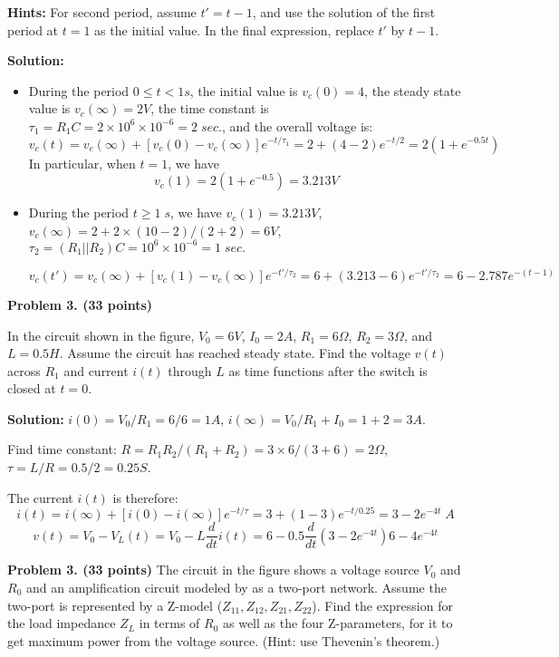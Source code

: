 \begin{enumerate}
{\bf Hints:} For second period, assume $t'=t-1$, and use the solution of
the first period at $t=1$ as the initial value. In the final expression, 
replace $t'$ by $t-1$.


   {\bf Solution:}
   \begin{itemize}
   \item During the period $0\le t<1 s$, the initial value is 
  	$v_c(0)=4$, the steady state value is $v_c(\infty)=2V$, the time 
  	constant is $\tau_1=R_1C=2\times 10^6\times 10^{-6}=2\;sec.$, and 
  	the overall voltage is:
  \[ v_c(t)=v_c(\infty)+[v_c(0)-v_c(\infty)] e^{-t/\tau_1}
  	=2+(4-2) e^{-t/2}=2(1+e^{-0.5t})	\]
   In particular, when $t=1$, we have
   \[ v_c(1)=2(1+e^{-0.5})=3.213V	\]
   
   \item During the period $t \ge 1\;s$, we have $v_c(1)=3.213V$, 
   	$v_c(\infty)=2+2\times (10-2)/(2+2)=6V$,
   	$\tau_2=(R_1||R_2)C=10^6 \times 10^{-6}=1\; sec.$
  
   \[	v_c(t')=v_c(\infty)+[v_c(1)-v_c(\infty)]e^{-t'/\tau_2}
   	=6+(3.213-6)e^{-t'/\tau_2}=6-2.787e^{-(t-1)} \]
  
 \end{itemize}

\end{enumerate}



\item {\bf Problem 3. (33 points)} 

In the circuit shown in the figure, $V_0=6V$, $I_0=2A$, $R_1=6\Omega$, 
$R_2=3\Omega$, and $L=0.5H$. Assume the circuit has reached steady state.
Find the voltage $v(t)$ across $R_1$ and current $i(t)$ through $L$ as 
time functions after the switch is closed at $t=0$.


{\bf Solution:} 
$i(0)=V_0/R_1=6/6=1A$, $i(\infty)=V_0/R_1+I_0=1+2=3A$. 

Find time constant: $R=R_1R_2/(R_1+R_2)=3\times 6/(3+6)=2\Omega$,
$\tau=L/R=0.5/2=0.25S$. 

The current $i(t)$ is therefore:
\[ i(t)=i(\infty)+[i(0)-i(\infty)]e^{-t/\tau}=3+(1-3)e^{-t/0.25}
	=3-2e^{-4t} \;A \]
\[ v(t)=V_0-V_L(t)=V_0-L\frac{d}{dt}i(t)=6-0.5 \frac{d}{dt}(3-2e^{-4t})
	6-4e^{-4t} \]


\item {\bf Problem 3. (33 points)} 
The circuit in the figure shows a voltage source $V_0$ and $R_0$ and an
amplification circuit modeled by as a two-port network. Assume the two-port 
is represented by a Z-model ($Z_{11}, Z_{12}, Z_{21}, Z_{22}$). Find the 
expression for the load impedance $Z_L$ in terms of $R_0$ as well as the
four Z-parameters, for it to get maximum power from the voltage source.
(Hint: use Thevenin's theorem.)

